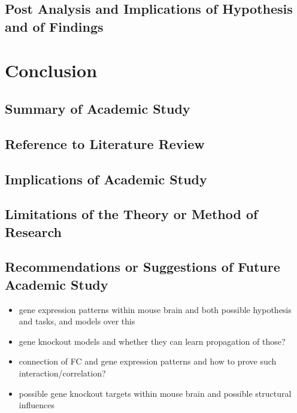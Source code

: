 \documentclass[]{article}
\begin{document}
\subsection*{Post Analysis and Implications of Hypothesis and of Findings}



\newpage
\section{Conclusion}
\label{sec:conclusion}

\subsection*{Summary of Academic Study}
\subsection*{Reference to Literature Review}
\subsection*{Implications of Academic Study}
\subsection*{Limitations of the Theory or Method of Research}
\subsection*{Recommendations or Suggestions of Future Academic Study}

\begin{itemize}
	\item gene expression patterns within mouse brain and both possible hypothesis and tasks, and models over this
	\item gene knockout models and whether they can learn propagation of those?
	\item connection of FC and gene expression patterns and how to prove such interaction/correlation?
	\item possible gene knockout targets within mouse brain and possible structural influences
\end{itemize}


\newpage


\end{document}
